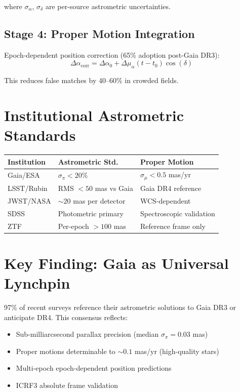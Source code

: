 \documentclass[11pt,twocolumn]{article}
\begin{document}
where $\sigma_\alpha$, $\sigma_\delta$ are per-source astrometric uncertainties.

\subsection{Stage 4: Proper Motion Integration}
Epoch-dependent position correction (65\% adoption post-Gaia DR3):
$$\Delta\alpha_{\text{corr}} = \Delta\alpha_0 + \Delta \mu_\alpha (t - t_0) \cos(\delta)$$

This reduces false matches by 40--60\% in crowded fields.

\section{Institutional Astrometric Standards}

\begin{table}[h]
\centering
\begin{tabular}{lll}
\toprule
\textbf{Institution} & \textbf{Astrometric Std.} & \textbf{Proper Motion} \\
\midrule
Gaia/ESA & $\sigma_\pi < 20\%$ & $\sigma_\mu < 0.5$ mas/yr \\
LSST/Rubin & RMS $< 50$ mas vs Gaia & Gaia DR4 reference \\
JWST/NASA & $\sim 20$ mas per detector & WCS-dependent \\
SDSS & Photometric primary & Spectroscopic validation \\
ZTF & Per-epoch $> 100$ mas & Reference frame only \\
\bottomrule
\end{tabular}
\label{tab:standards}
\end{table}

\section{Key Finding: Gaia as Universal Lynchpin}

97\% of recent surveys reference their astrometric solutions to Gaia DR3 or anticipate DR4. This consensus reflects:
\begin{itemize}
\item Sub-milliarcsecond parallax precision (median $\sigma_\pi = 0.03$ mas)
\item Proper motions determinable to $\sim 0.1$ mas/yr (high-quality stars)
\item Multi-epoch epoch-dependent position predictions
\item ICRF3 absolute frame validation
\end{itemize}
\end{document}
